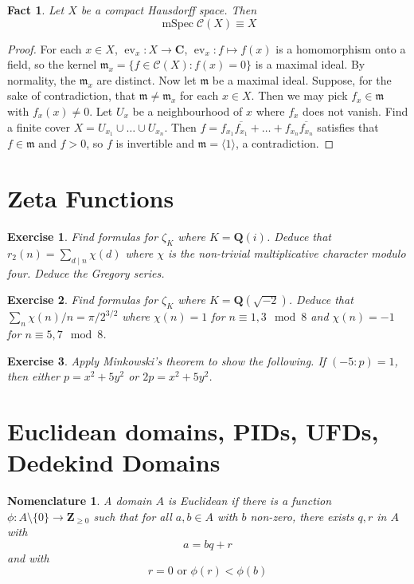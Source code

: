 \documentclass[12pt]{article}
\newtheorem*{fact*}{Fact}
\newtheorem*{nomn*}{Nomenclature}
\newtheorem*{exer*}{Exercise}
\DeclareMathOperator{\ev}{ev}
\newcommand{\gen}[1]{\langle#1\rangle}
\newcommand{\m}{\mathfrak{m}}
\DeclareMathOperator{\mspec}{mSpec}
\newcommand{\C}{\mathbf{C}}
\newcommand{\CC}{\mathscr{C}}
\newcommand{\Q}{\mathbf{Q}}
\newcommand{\Z}{\mathbf{Z}}
\begin{document}
\begin{fact*}
Let $X$ be a compact Hausdorff space. Then \[\boxed{\mspec \CC(X) \equiv X}\]
\end{fact*}


\begin{proof}
For each $x\in X$, $\ev_x : X\to\C$, $\ev_x : f\mapsto f(x)$ is a homomorphism onto a field, so the kernel $\m_x = \{f\in\CC(X) : f(x) = 0\}$ is a maximal ideal. By normality, the $\m_x$ are distinct. Now let $\m$ be a maximal ideal. Suppose, for the sake of contradiction, that $\m\neq\m_x$ for each $x\in X$. Then we may pick $f_x\in \m$ with $f_x(x)\neq 0$. Let $U_x$ be a neighbourhood of $x$ where $f_x$ does not vanish. Find a finite cover $X= U_{x_1}\cup \dots\cup U_{x_n}$. Then $f=f_{x_1}\overline{f_{x_1}} + \dots + f_{x_n}\overline{f_{x_n}}$ satisfies that $f\in\m$ and $f>0$, so $f$ is invertible and $\m=\gen{1}$, a contradiction.
\end{proof}


\newpage
\section{Zeta Functions}
\begin{exer*}
Find formulas for $\zeta_K$ where $K=\Q(i)$. Deduce that $r_2(n) = \sum_{d\mid n}\chi(d)$ where $\chi$ is the non-trivial multiplicative character modulo four. Deduce the Gregory series.
\end{exer*}

\begin{exer*}
Find formulas for $\zeta_K$ where $K=\Q(\sqrt{-2})$. Deduce that $\sum_{n}\chi(n)/n = \pi/2^{3/2}$ where $\chi(n) = 1$ for $n\equiv 1,3\mod 8$ and $\chi(n) = -1$ for $n\equiv 5,7\mod 8$.
\end{exer*}


\begin{exer*}
Apply Minkowski's theorem to show the following. If $(-5:p)=1$, then either $p=x^2+5y^2$ or $2p=x^2+5y^2$.
\end{exer*}


\newpage
\section{Euclidean domains, PIDs, UFDs, Dedekind Domains}

\begin{nomn*}
A domain $A$ is \emph{Euclidean} if there is a function $\phi:A\setminus\{0\} \to \Z_{\ge0}$ such that for all $a,b\in A$ with $b$ non-zero, there exists $q,r$ in $A$ with \[a = bq + r\] and with \[r=0 \text{ or }\phi(r) < \phi(b)\]
\end{nomn*}
\end{document}
